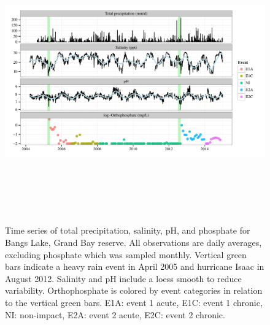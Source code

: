 \documentclass[letterpaper,12pt]{article}\usepackage[]{graphicx}\usepackage[]{color}
\makeatletter
\def\maxwidth{ %
  \ifdim\Gin@nat@width>\linewidth
    \linewidth
  \else
    \Gin@nat@width
  \fi
}
\makeatother
\begin{document}
\setcounter{figure}{1}
\setcounter{table}{1}

\begin{landscape}
\centering\vspace*{\fill}
\begin{figure}[!ht]

{\centering \includegraphics[width=\maxwidth,height=4.8in]{figs/tsplot-1} 

}

\caption[Time series of total precipitation, salinity, pH, and phosphate for Bangs Lake, Grand Bay reserve]{Time series of total precipitation, salinity, pH, and phosphate for Bangs Lake, Grand Bay reserve.  All observations are daily averages, excluding phosphate which was sampled monthly.  Vertical green bars indicate a heavy rain event in April 2005 and hurricane Isaac in August 2012.  Salinity and pH include a loess smooth to reduce variability. Orthophosphate is colored by event categories in relation to the vertical green bars.  E1A: event 1 acute, E1C: event 1 chronic, NI: non-impact, E2A: event 2 acute, E2C: event 2 chronic.}\label{fig:tsplot}
\end{figure}


\end{landscape}
\clearpage
\end{document}
